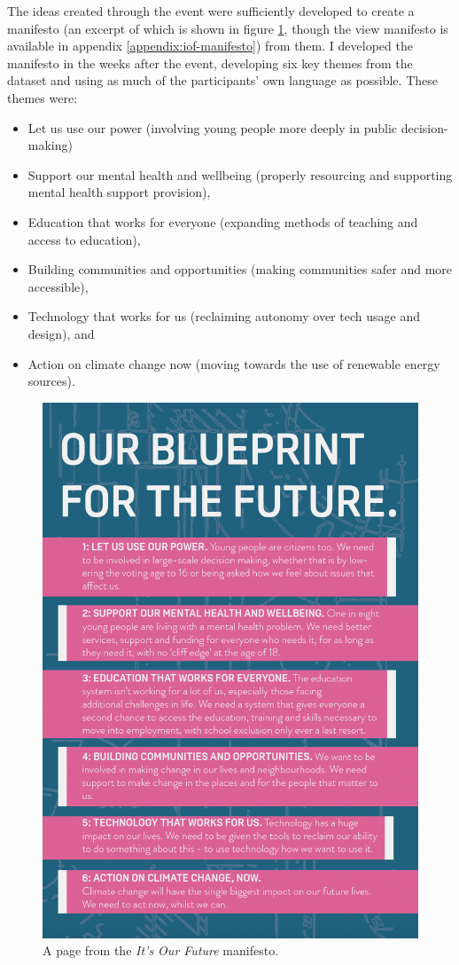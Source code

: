 The ideas created through the event were sufficiently developed to create a manifesto (an excerpt of which is shown in figure \ref{fig:iof-manifesto}, though the view manifesto is available in appendix \ref{appendix:iof-manifesto}) from them. I developed the manifesto in the weeks after the event, developing six key themes from the dataset and using as much of the participants' own language as possible. These themes were:
\begin{itemize}
    \item Let us use our power (involving young people more deeply in public decision-making)
    \item Support our mental health and wellbeing (properly resourcing and supporting mental health support provision),
    \item Education that works for everyone (expanding methods of teaching and access to education),
    \item Building communities and opportunities (making communities safer and more accessible),
    \item Technology that works for us (reclaiming autonomy over tech usage and design), and
    \item Action on climate change now (moving towards the use of renewable energy sources).
    \end{itemize}
\begin{figure}
    \centering
    \includegraphics[width=1\linewidth]{Images/7/iof-manifesto.png}
    \caption{A page from the \textit{It's Our Future} manifesto.}
    \label{fig:iof-manifesto}
\end{figure}
